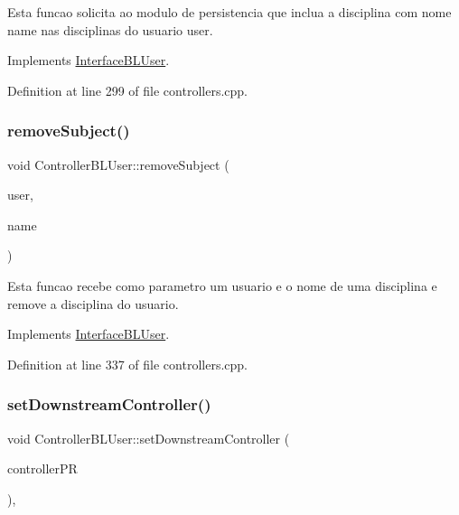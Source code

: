 Esta funcao solicita ao modulo de persistencia que inclua a disciplina com nome name nas disciplinas do usuario user. 

Implements \hyperlink{class_interface_b_l_user_a6b39f9aa9dff139987d2d6919a78c3d4}{Interface\+B\+L\+User}.



Definition at line 299 of file controllers.\+cpp.

\mbox{\label{class_controller_b_l_user_aaed19dcb20672c4bfe3c98f18d1c0a2e}} 
\subsubsection{\texorpdfstring{remove\+Subject()}{removeSubject()}}
{\footnotesize\ttfamily void Controller\+B\+L\+User\+::remove\+Subject (\begin{DoxyParamCaption}\item[{\hyperlink{class_user}{User} $\ast$}]{user,  }\item[{const string \&}]{name }\end{DoxyParamCaption})\hspace{0.3cm}{\ttfamily [virtual]}}

Esta funcao recebe como parametro um usuario e o nome de uma disciplina e remove a disciplina do usuario. 

Implements \hyperlink{class_interface_b_l_user_a1444133d057934d4905bfcdf0cc4712b}{Interface\+B\+L\+User}.



Definition at line 337 of file controllers.\+cpp.

\mbox{\label{class_controller_b_l_user_a4594159d854a4bbb2aef17e7ef688821}} 
\subsubsection{\texorpdfstring{set\+Downstream\+Controller()}{setDownstreamController()}}
{\footnotesize\ttfamily void Controller\+B\+L\+User\+::set\+Downstream\+Controller (\begin{DoxyParamCaption}\item[{\hyperlink{class_stub_p_r}{Stub\+PR} $\ast$}]{controller\+PR }\end{DoxyParamCaption})\hspace{0.3cm}{\ttfamily [inline]}, {\ttfamily [virtual]}}



